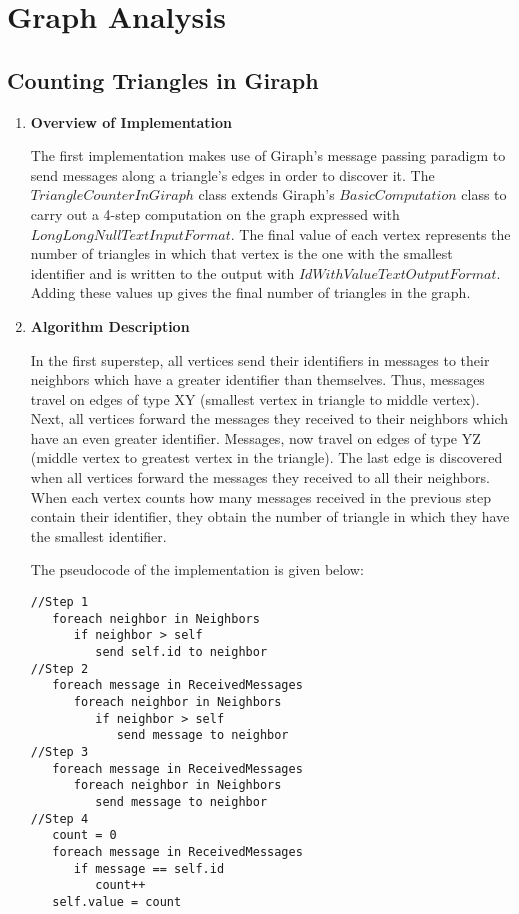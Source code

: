\documentclass[Graph.tex]{subfiles}
\begin{document}
\section{Graph Analysis}

\subsection{Counting Triangles in Giraph}

\begin{enumerate}[a]

\item{
\textbf{Overview of Implementation}

The first implementation makes use of Giraph's message passing paradigm to send messages along a triangle's edges in order to discover it. The $TriangleCounterInGiraph$ class extends Giraph's $BasicComputation$ class to carry out a 4-step computation on the graph expressed with $LongLongNullTextInputFormat$. The final value of each vertex represents the number of triangles in which that vertex is the one with the smallest identifier and is written to the output with $IdWithValueTextOutputFormat$. Adding these values up gives the final number of triangles in the graph.
}

\item{
\textbf{Algorithm Description}

In the first superstep, all vertices send their identifiers in messages to their neighbors which have a greater identifier than themselves. Thus, messages travel on edges of type XY (smallest vertex in triangle to middle vertex). Next, all vertices forward the messages they received to their neighbors which have an even greater identifier. Messages, now travel on edges of type YZ (middle vertex to greatest vertex in the triangle). The last edge is discovered when all vertices forward the messages they received to all their neighbors. When each vertex counts how many messages received in the previous step contain their identifier, they obtain the number of triangle in which they have the smallest identifier.

The pseudocode of the implementation is given below:

\begin{lstlisting}
//Step 1
   foreach neighbor in Neighbors
      if neighbor > self
         send self.id to neighbor
//Step 2
   foreach message in ReceivedMessages
      foreach neighbor in Neighbors
         if neighbor > self
            send message to neighbor
//Step 3
   foreach message in ReceivedMessages
      foreach neighbor in Neighbors
         send message to neighbor
//Step 4
   count = 0
   foreach message in ReceivedMessages
      if message == self.id
         count++
   self.value = count
\end{lstlisting}

}

\end{enumerate}
\end{document}
